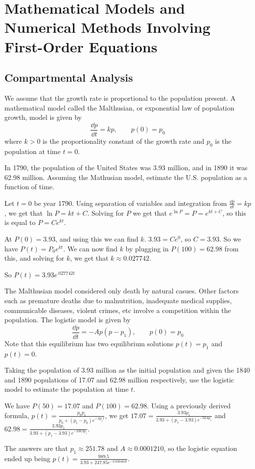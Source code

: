 \documentclass[../diffeq.tex]{subfiles}
\begin{document}
\chapter{Mathematical Models and Numerical Methods Involving First-Order Equations}
\section{Compartmental Analysis}
We assume that the growth rate is proportional to the population present. A mathematical model called the Malthusian, or exponential law of population growth, model is given by 
\[ \frac{\dd p}{\dd t}=kp, \qquad p(0)=p_0 \]
where $k>0$ is the proportionality constant of the growth rate and $p_0$ is the population at time $t=0$.

\begin{example}
    In 1790, the population of the United States was 3.93 million, and in 1890 it was 62.98 million. Assuming the Mathusian model, estimate the U.S. population as a function of time.

    Let $t=0$ be year 1790. Using separation of variables and integration from $\frac{\dd p}{\dd t}=kp$, we get that $\ln P = kt + C$. Solving for $P$ we get that $e^{\ln P}=P=e^{kt+C}$, so this is equal to $P=Ce^{kt}$.

    At $P(0)=3.93$, and using this we can find $k$. $3.93=Ce^0$, so $C=3.93$. So we have $P(t)=P_0e^{kt}$. We can now find $k$ by plugging in $P(100)=62.98$ from this, and solving for $k$, we get that $k\approx 0.027742$.

    So $P(t)=3.93e^{.027742t}$
\end{example}

The Malthusian model considered only death by natural casues. Other factors such as premature deaths due to malnutrition, inadequate medical supplies, communicable diseases, violent crimes, etc involve a competition within the population. The logistic model is given by 
\[ \frac{\dd p}{\dd t}=-Ap(p-p_1), \qquad p(0)=p_0 \]
Note that this equilibrium has two equilibrium solutions $p(t)=p_1$ and $p(t)=0$.

\begin{example}
    Taking the population of 3.93 million as the initial population and given the 1840 and 1890 populations of 17.07 and 62.98 million respectively, use the logistic model to estimate the population at time $t$.

    We have $P(50)=17.07$ and $P(100)=62.98$. Using a previously derived formula, $p(t)=\frac{p_0p_1}{p_0+(p_1-p_0)e^{-Ap_1t}}$, we get $17.07=\frac{3.93p_1}{3.93+(p_1-3.93)e^{-50Ap_1}}$ and $62.98=\frac{3.93p_1}{3.93+(p_1-3.93)e^{-100Ap_1}}$. 

    The answers are that $p_1\approx 251.78$ and $A\approx 0.0001210$, so the logistic equation ended up being $p(t)=\frac{989.5}{3.93+247.85e^{-0.030463t}}$.
\end{example}
\end{document}
